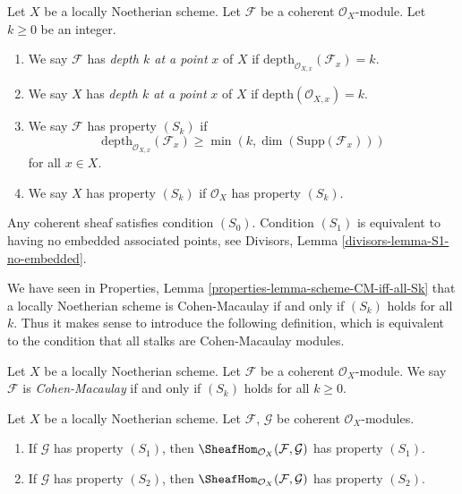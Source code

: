 \begin{definition}
\label{definition-depth}
Let $X$ be a locally Noetherian scheme.
Let $\mathcal{F}$ be a coherent $\mathcal{O}_X$-module.
Let $k \geq 0$ be an integer.
\begin{enumerate}
\item We say $\mathcal{F}$ has {\it depth $k$ at a point}
$x$ of $X$ if $\text{depth}_{\mathcal{O}_{X, x}}(\mathcal{F}_x) = k$.
\item We say $X$ has {\it depth $k$ at a point} $x$ of $X$ if
$\text{depth}(\mathcal{O}_{X, x}) = k$.
\item We say $\mathcal{F}$ has property {\it $(S_k)$} if
$$
\text{depth}_{\mathcal{O}_{X, x}}(\mathcal{F}_x)
\geq \min(k, \dim(\text{Supp}(\mathcal{F}_x)))
$$
for all $x \in X$.
\item We say $X$ has property {\it $(S_k)$} if $\mathcal{O}_X$ has
property $(S_k)$.
\end{enumerate}
\end{definition}

\noindent
Any coherent sheaf satisfies condition $(S_0)$.
Condition $(S_1)$ is equivalent to having no embedded associated
points, see Divisors, Lemma \ref{divisors-lemma-S1-no-embedded}.

\medskip\noindent
We have seen in Properties, Lemma \ref{properties-lemma-scheme-CM-iff-all-Sk}
that a locally Noetherian
scheme is Cohen-Macaulay if and only if $(S_k)$ holds for all $k$.
Thus it makes sense to introduce the following definition, which
is equivalent to the condition that all stalks are Cohen-Macaulay modules.

\begin{definition}
\label{definition-Cohen-Macaulay}
Let $X$ be a locally Noetherian scheme.
Let $\mathcal{F}$ be a coherent $\mathcal{O}_X$-module.
We say $\mathcal{F}$ is {\it Cohen-Macaulay} if and only
if $(S_k)$ holds for all $k \geq 0$.
\end{definition}

\begin{lemma}
\label{lemma-hom-into-S2}
Let $X$ be a locally Noetherian scheme. Let $\mathcal{F}$, $\mathcal{G}$
be coherent $\mathcal{O}_X$-modules.
\begin{enumerate}
\item If $\mathcal{G}$ has property $(S_1)$, then
$\SheafHom_{\mathcal{O}_X}(\mathcal{F}, \mathcal{G})$ has property $(S_1)$.
\item If $\mathcal{G}$ has property $(S_2)$, then
$\SheafHom_{\mathcal{O}_X}(\mathcal{F}, \mathcal{G})$ has property $(S_2)$.
\end{enumerate}
\end{lemma}

